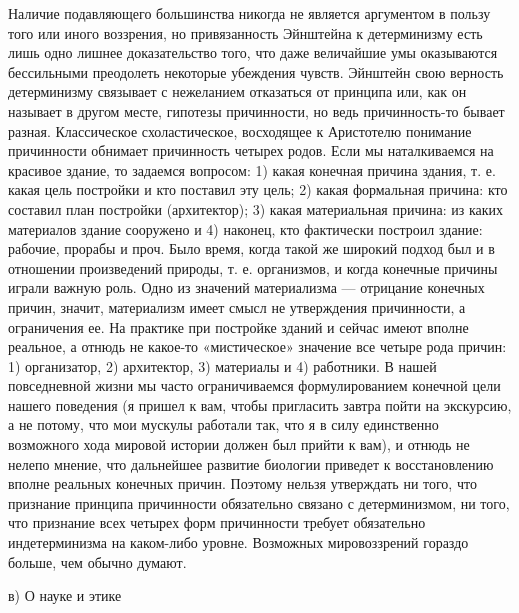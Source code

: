 Наличие  подавляющего большинства  никогда  не  является аргументом  в
пользу  того  или  иного   воззрения,  но  привязанность  Эйнштейна  к
детерминизму  есть  лишь одно  лишнее  доказательство  того, что  даже
величайшие умы оказываются  бессильными преодолеть некоторые убеждения
чувств.  Эйнштейн свою  верность детерминизму  связывает с  нежеланием
отказаться от принципа  или, как он называет в  другом месте, гипотезы
причинности,  но  ведь   причинность-то  бывает  разная.  Классическое
схоластическое, восходящее к Аристотелю понимание причинности обнимает
причинность четырех  родов. Если мы наталкиваемся  на красивое здание,
то задаемся  вопросом: 1) какая  конечная причина здания, т.  е. какая
цель постройки и  кто поставил эту цель; 2)  какая формальная причина:
кто  составил  план  постройки  (архитектор);  3)  какая  материальная
причина:  из  каких материалов  здание  сооружено  и 4)  наконец,  кто
фактически построил здание: рабочие, прорабы и проч. Было время, когда
такой же  широкий подход  был и в  отношении произведений  природы, т.
е.  организмов, и  когда  конечные причины  играли  важную роль.  Одно
из  значений  материализма  ---  отрицание  конечных  причин,  значит,
материализм имеет смысл не  утверждения причинности, а ограничения ее.
На практике  при постройке  зданий и сейчас  имеют вполне  реальное, а
отнюдь не какое-то  «мистическое» значение все четыре  рода причин: 1)
организатор,  2) архитектор,  3)  материалы и  4)  работники. В  нашей
повседневной  жизни мы  часто ограничиваемся  формулированием конечной
цели нашего поведения  (я пришел к вам, чтобы  пригласить завтра пойти
на экскурсию, а не потому, что мои  мускулы работали так, что я в силу
единственно возможного хода мировой истории  должен был прийти к вам),
и отнюдь не  нелепо мнение, что дальнейшее  развитие биологии приведет
к  восстановлению  вполне  реальных конечных  причин.  Поэтому  нельзя
утверждать  ни того,  что признание  принципа причинности  обязательно
связано  с детерминизмом,  ни того,  что признание  всех четырех  форм
причинности требует  обязательно индетерминизма на  каком-либо уровне.
Возможных мировоззрений гораздо больше, чем обычно думают.

в) О науке и этике

